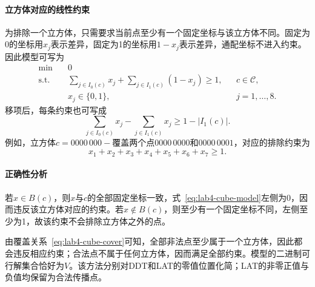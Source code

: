 \paragraph{立方体对应的线性约束}

为排除一个立方体，只需要求当前点至少有一个固定坐标与该立方体不同。固定为0的坐标用$x_j$表示差异，固定为1的坐标用$1-x_j$表示差异，通配坐标不进入约束。因此模型可写为
\begin{equation}
\begin{aligned}
\min\quad &0\\
\text{s.t.}\quad
&\sum_{j\in I_0(c)}x_j
+\sum_{j\in I_1(c)}(1-x_j)\ge1,
&&c\in\mathcal C,\\
&x_j\in\{0,1\},
&&j=1,\ldots,8.
\end{aligned}
\label{eq:lab4-cube-model}
\end{equation}
移项后，每条约束也可写成
\[
\sum_{j\in I_0(c)}x_j-\sum_{j\in I_1(c)}x_j
\ge1-|I_1(c)|.
\]
例如，立方体$c=0000\,000-$覆盖两个点$0000\,0000$和$0000\,0001$，对应的排除约束为
\[
x_1+x_2+x_3+x_4+x_5+x_6+x_7\ge1.
\]

\paragraph{正确性分析}

若$x\in B(c)$，则$x$与$c$的全部固定坐标一致，式~\eqref{eq:lab4-cube-model}左侧为0，因而违反该立方体对应的约束。若$x\notin B(c)$，则至少有一个固定坐标不同，左侧至少为1，故该约束不会排除立方体之外的点。

由覆盖关系~\eqref{eq:lab4-cube-cover}可知，全部非法点至少属于一个立方体，因此都会违反相应约束；合法点不属于任何立方体，因而满足全部约束。模型的二进制可行解集合恰好为$V$。该方法分别对DDT和LAT的零值位置化简；LAT的非零正值与负值均保留为合法传播点。
